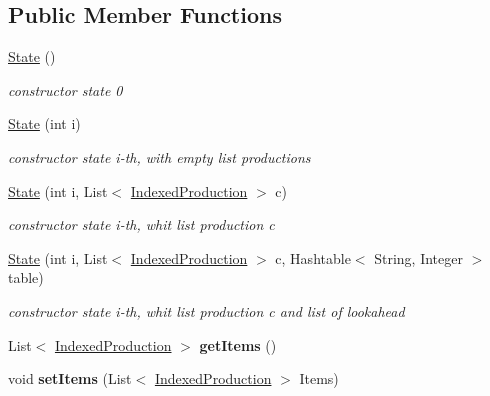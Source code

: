 \subsection*{Public Member Functions}
\begin{DoxyCompactItemize}
\item 
\hypertarget{classcontext_free_1_1scanner_1_1_state_ae93b8be2177c617058502abfcfce5204}{\hyperlink{classcontext_free_1_1scanner_1_1_state_ae93b8be2177c617058502abfcfce5204}{State} ()}\label{classcontext_free_1_1scanner_1_1_state_ae93b8be2177c617058502abfcfce5204}

\begin{DoxyCompactList}\small\item\em constructor state 0 \end{DoxyCompactList}\item 
\hyperlink{classcontext_free_1_1scanner_1_1_state_a81cd656c8ed26ba10aedd6598d090dcc}{State} (int i)
\begin{DoxyCompactList}\small\item\em constructor state i-\/th, with empty list productions \end{DoxyCompactList}\item 
\hyperlink{classcontext_free_1_1scanner_1_1_state_a8dc8e0da9fdc805b0202f66eebce1e57}{State} (int i, List$<$ \hyperlink{classcontext_free_1_1scanner_1_1_indexed_production}{Indexed\-Production} $>$ c)
\begin{DoxyCompactList}\small\item\em constructor state i-\/th, whit list production c \end{DoxyCompactList}\item 
\hyperlink{classcontext_free_1_1scanner_1_1_state_a7ab62a86fa7c7072e898d9b8ab1b3cd5}{State} (int i, List$<$ \hyperlink{classcontext_free_1_1scanner_1_1_indexed_production}{Indexed\-Production} $>$ c, Hashtable$<$ String, Integer $>$ table)
\begin{DoxyCompactList}\small\item\em constructor state i-\/th, whit list production c and list of lookahead \end{DoxyCompactList}\item 
\hypertarget{classcontext_free_1_1scanner_1_1_state_a47e8e15d2cfc4a1bec7102605cbfbfc6}{List$<$ \hyperlink{classcontext_free_1_1scanner_1_1_indexed_production}{Indexed\-Production} $>$ {\bfseries get\-Items} ()}\label{classcontext_free_1_1scanner_1_1_state_a47e8e15d2cfc4a1bec7102605cbfbfc6}

\item 
\hypertarget{classcontext_free_1_1scanner_1_1_state_a4cf3061ae4e061bb5bda4151d25b5c76}{void {\bfseries set\-Items} (List$<$ \hyperlink{classcontext_free_1_1scanner_1_1_indexed_production}{Indexed\-Production} $>$ Items)}\label{classcontext_free_1_1scanner_1_1_state_a4cf3061ae4e061bb5bda4151d25b5c76}


\end{DoxyCompactItemize}
